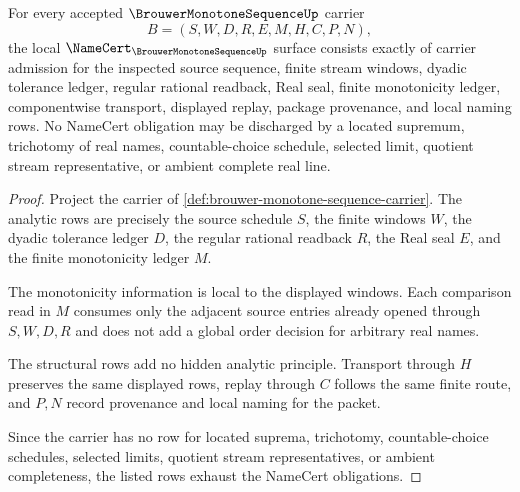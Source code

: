 \begin{theorem}
\label{thm:brouwer-monotone-sequence-namecert-obligations}
For every accepted $\BrouwerMonotoneSequenceUp$ carrier
$$
B=(S,W,D,R,E,M,H,C,P,N),
$$
the local $\NameCert_{\BrouwerMonotoneSequenceUp}$ surface consists exactly of carrier admission for the inspected source sequence, finite stream windows, dyadic tolerance ledger, regular rational readback, Real seal, finite monotonicity ledger, componentwise transport, displayed replay, package provenance, and local naming rows. No NameCert obligation may be discharged by a located supremum, trichotomy of real names, countable-choice schedule, selected limit, quotient stream representative, or ambient complete real line.
\end{theorem}
\begin{proof}
Project the carrier of \autoref{def:brouwer-monotone-sequence-carrier}. The analytic rows are precisely the source schedule $S$, the finite windows $W$, the dyadic tolerance ledger $D$, the regular rational readback $R$, the Real seal $E$, and the finite monotonicity ledger $M$.

The monotonicity information is local to the displayed windows. Each comparison read in $M$ consumes only the adjacent source entries already opened through $S,W,D,R$ and does not add a global order decision for arbitrary real names.

The structural rows add no hidden analytic principle. Transport through $H$ preserves the same displayed rows, replay through $C$ follows the same finite route, and $P,N$ record provenance and local naming for the packet.

Since the carrier has no row for located suprema, trichotomy, countable-choice schedules, selected limits, quotient stream representatives, or ambient completeness, the listed rows exhaust the NameCert obligations.
\end{proof}

